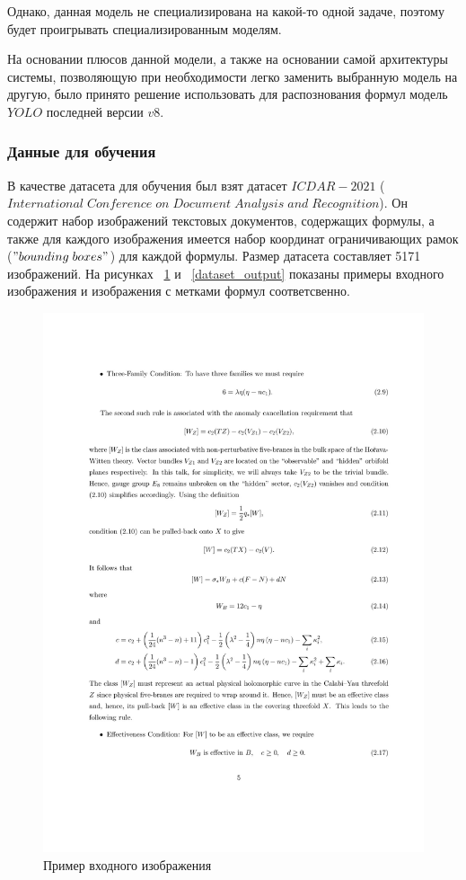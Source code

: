 Однако, данная модель не специализирована на какой-то одной задаче, поэтому будет проигрывать специализированным моделям.

На основании плюсов данной модели, а также на основании самой архитектуры системы, позволяющую при необходимости легко заменить выбранную модель на другую, было принято решение использовать для распознования формул модель $YOLO$ последней версии $v8$.

\subsubsection{Данные для обучения}

В качестве датасета для обучения был взят датасет $ICDAR-2021$ ($International\;Conference\;on\;Document\;Analysis\;and\;Recognition$). Он содержит набор изображений текстовых документов, содержащих формулы, 
а также для каждого изображения имеется набор координат ограничивающих рамок ($"bounding\; boxes"$) для каждой формулы.
Размер датасета составляет 5171 изображений.
На рисунках ~\ref{dataset_input} и ~\ref{dataset_output} показаны примеры входного изображения и изображения с метками формул соответсвенно.

\begin{figure}
    \includegraphics[scale=0.25]{img/dataset/input.jpg}
    \caption{Пример входного изображения}
    \label{dataset_input}
\end{figure}

